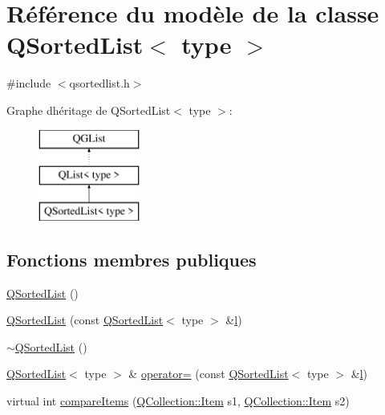 \hypertarget{class_q_sorted_list}{}\section{Référence du modèle de la classe Q\+Sorted\+List$<$ type $>$}
\label{class_q_sorted_list}


{\ttfamily \#include $<$qsortedlist.\+h$>$}

Graphe d\textquotesingle{}héritage de Q\+Sorted\+List$<$ type $>$\+:\begin{figure}[H]
\begin{center}
\leavevmode
\includegraphics[height=3.000000cm]{class_q_sorted_list}
\end{center}
\end{figure}
\subsection*{Fonctions membres publiques}
\begin{DoxyCompactItemize}
\item 
\hyperlink{class_q_sorted_list_abdde9d0f4cd0bd44b10420dde20aca62}{Q\+Sorted\+List} ()
\item 
\hyperlink{class_q_sorted_list_a184a796c61d279eca17304ca6215979f}{Q\+Sorted\+List} (const \hyperlink{class_q_sorted_list}{Q\+Sorted\+List}$<$ type $>$ \&\hyperlink{060__command__switch_8tcl_aff56f84b49947b84b2a304f51cf8e678}{l})
\item 
\hyperlink{class_q_sorted_list_a11fccb441a6d6fc9e9e15564b241033d}{$\sim$\+Q\+Sorted\+List} ()
\item 
\hyperlink{class_q_sorted_list}{Q\+Sorted\+List}$<$ type $>$ \& \hyperlink{class_q_sorted_list_a723521f9216d3cfe078f3cb0062443a1}{operator=} (const \hyperlink{class_q_sorted_list}{Q\+Sorted\+List}$<$ type $>$ \&\hyperlink{060__command__switch_8tcl_aff56f84b49947b84b2a304f51cf8e678}{l})
\item 
virtual int \hyperlink{class_q_sorted_list_ac668d73e64708886064106eebecf33ae}{compare\+Items} (\hyperlink{class_q_collection_ac6f3ddbf999e31fb797927f71ae6b5d7}{Q\+Collection\+::\+Item} s1, \hyperlink{class_q_collection_ac6f3ddbf999e31fb797927f71ae6b5d7}{Q\+Collection\+::\+Item} s2)
\end{DoxyCompactItemize}


